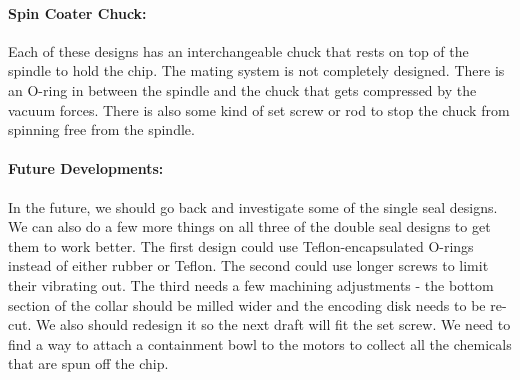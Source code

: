 \documentclass[12pt]{report}
\begin{document}
\paragraph{Spin Coater Chuck:} Each of these designs has an interchangeable chuck that rests on top of the spindle to hold the chip. The mating system is not completely designed. There is an O-ring in between the spindle and the chuck that gets compressed by the vacuum forces. There is also some kind of set screw or rod to stop the chuck from spinning free from the spindle.


\paragraph{Future Developments:} In the future, we should go back and investigate some of the single seal designs. We can also do a few more things on all three of the double seal designs to get them to work better. The first design could use Teflon-encapsulated O-rings instead of either rubber or Teflon. The second could use longer screws to limit their vibrating out. The third needs a few machining adjustments - the bottom section of the collar should be milled wider and the encoding disk needs to be re-cut. We also should redesign it so the next draft will fit the set screw. We need to find a way to attach a containment bowl to the motors to collect all the chemicals that are spun off the chip.
\end{document}
